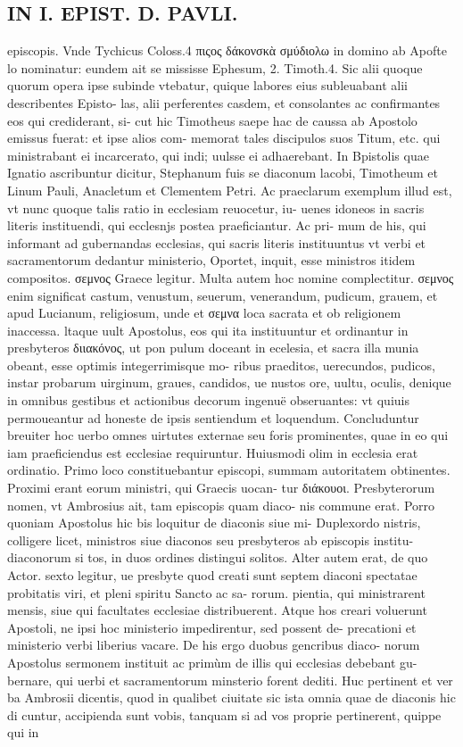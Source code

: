 \documentclass{article}
\begin{document}
\begin{pages}
\section*{IN I. EPIST. D. PAVLI. }
\marginpar{[ p.82 ]}\pstart episcopis. Vnde Tychicus Coloss.4 πιςος δάκονσκὰ σμύδιολω in domino ab Apofte lo nominatur: eundem ait se mississe Ephesum, 2. Timoth.4. Sic alii quoque quorum opera ipse subinde vtebatur, quique labores eius subleuabant alii describentes Episto- las, alii perferentes casdem, et consolantes ac confirmantes eos qui crediderant, si- cut hic Timotheus saepe hac de caussa ab Apostolo emissus fuerat: et ipse alios com- memorat tales discipulos suos Titum, etc. qui ministrabant ei incarcerato, qui indi; uulsse ei adhaerebant. In Bpistolis quae Ignatio ascribuntur dicitur, Stephanum fuis se diaconum lacobi, Timotheum et Linum Pauli, Anacletum et Clementem Petri. Ac praeclarum exemplum illud est, vt nunc quoque talis ratio in ecclesiam reuocetur, iu- uenes idoneos in sacris literis instituendi, qui ecclesnjs postea praeficiantur. Ac pri- mum de his, qui informant ad gubernandas ecclesias, qui sacris literis instituuntus vt verbi et sacramentorum dedantur ministerio, Oportet, inquit, esse ministros itidem compositos. σεμνος Graece legitur. Multa autem hoc nomine complectitur. σεμνος enim significat castum, venustum, seuerum, venerandum, pudicum, grauem, et apud Lucianum, religiosum, unde et σεμνα loca sacrata et ob religionem inaccessa. ltaque  uult Apostolus, eos qui ita instituuntur et ordinantur in presbyteros διιακόνος, ut pon pulum doceant in ecelesia, et sacra illa munia obeant, esse optimis integerrimisque mo- ribus praeditos, uerecundos, pudicos, instar probarum uirginum, graues, candidos, ue nustos ore, uultu, oculis, denique in omnibus gestibus et actionibus decorum ingenuë obseruantes: vt quiuis permoueantur ad honeste de ipsis sentiendum et loquendum. Concluduntur breuiter hoc uerbo omnes uirtutes externae seu foris prominentes, quae in eo qui iam praeficiendus est ecclesiae requiruntur.  \pend\pstart Huiusmodi olim in ecclesia erat ordinatio. Primo loco constituebantur episcopi, summam autoritatem obtinentes. Proximi erant eorum ministri, qui Graecis uocan- tur διάκουοι. Presbyterorum nomen, vt Ambrosius ait, tam episcopis quam diaco- nis commune erat. Porro quoniam Apostolus hic bis loquitur de diaconis siue mi- Duplexordo nistris, colligere licet, ministros siue diaconos seu presbyteros ab episcopis institu- diaconorum si tos, in duos ordines distingui solitos. Alter autem erat, de quo Actor. sexto legitur, ue presbyte quod creati sunt septem diaconi spectatae probitatis viri, et pleni spiritu Sancto ac sa- rorum. pientia, qui ministrarent mensis, siue qui facultates ecclesiae distribuerent. Atque hos creari voluerunt Apostoli, ne ipsi hoc ministerio impedirentur, sed possent de- precationi et ministerio verbi liberius vacare. De his ergo duobus gencribus diaco- norum Apostolus sermonem instituit ac primùm de illis qui ecclesias debebant gu- bernare, qui uerbi et sacramentorum minsterio forent dediti. Huc pertinent et ver ba Ambrosii dicentis, quod in qualibet ciuitate sic ista omnia quae de diaconis hic di cuntur, accipienda sunt vobis, tanquam si ad vos proprie pertinerent, quippe qui in 
\end{pages}
\end{document}
